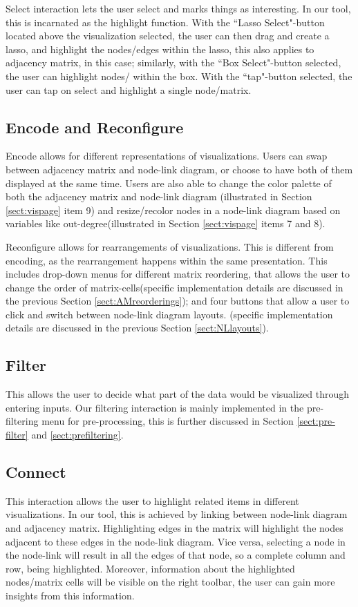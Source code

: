 \documentclass[journal]{vgtc}                %
\begin{document}
Select interaction lets the user select and marks things as interesting. \cite{Yi:2007} In our tool, this is incarnated as the highlight function. With the ``Lasso Select"-button located above the visualization selected, the user can then drag and create a lasso, and highlight the nodes/edges within the lasso, this also applies to adjacency matrix, in this case; similarly, with the ``Box Select"-button selected, the user can highlight nodes/ within the box. 
With the ``tap"-button selected, the user can tap on select and highlight a single node/matrix.  

\subsection{Encode and Reconfigure} 
Encode allows for different representations of visualizations.\cite{Yi:2007} Users can swap between adjacency matrix and node-link diagram, or choose to have both of them displayed at the same time. Users are also able to change the color palette of both the adjacency matrix and node-link diagram (illustrated in Section \ref{sect:vispage} item 9) and resize/recolor nodes in a node-link diagram based on variables like out-degree(illustrated in Section \ref{sect:vispage} items 7 and 8).   

Reconfigure allows for rearrangements of visualizations. This is different from encoding, as the rearrangement happens within the same presentation.  This includes drop-down menus for different matrix reordering, that allows the user to change the order of matrix-cells(specific implementation details are discussed in the previous Section \ref{sect:AMreorderings}); and four buttons that allow a user to click and switch between node-link diagram layouts. (specific implementation details are discussed in the previous Section \ref{sect:NLlayouts}). 

\subsection{Filter}
This allows the user to decide what part of the data would be visualized through entering inputs. \cite{Yi:2007} 
Our filtering interaction is mainly implemented in the pre-filtering menu for pre-processing, this is further discussed in Section \ref{sect:pre-filter} and \ref{sect:prefiltering}.

\subsection{Connect}
This interaction allows the user to highlight related items in different visualizations. \cite{Yi:2007} In our tool, this is achieved by linking between node-link diagram and adjacency matrix. Highlighting edges in the matrix will highlight the nodes adjacent to these edges in the node-link diagram. Vice versa, selecting a node in the node-link will result in all the edges of that node, so a complete column and row, being highlighted. Moreover, information about the highlighted nodes/matrix cells will be visible on the right toolbar, the user can gain more insights from this information. 
\end{document}
